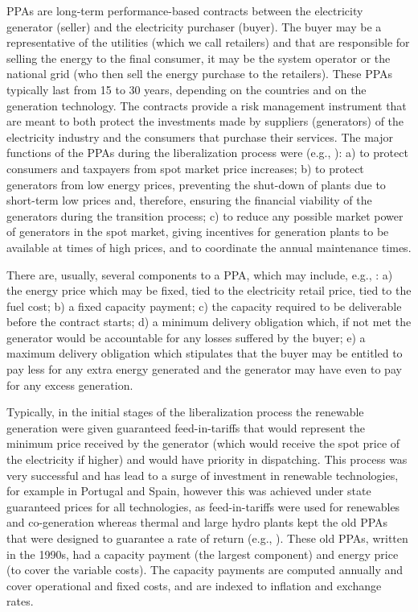 \documentclass[informs]{informs3}
\begin{document}
PPAs are long-term performance-based contracts between the electricity generator (seller) and the electricity purchaser (buyer). The buyer may be a representative of the utilities (which we call retailers) and that are responsible for selling the energy to the final consumer, it may be the system operator or the national grid (who then sell the energy purchase to the retailers). These PPAs typically last from 15 to 30 years, depending on the countries and on the generation technology. The contracts provide a risk management instrument that are meant to both protect the investments made by suppliers (generators) of the electricity industry and the consumers that purchase their services. The major functions of the PPAs during the liberalization process were (e.g., \citealp{Kee_2001}): a) to protect consumers and taxpayers from spot market price increases; b) to protect generators from low energy prices, preventing the shut-down of plants due to short-term low prices and, therefore, ensuring the financial viability of the generators during the transition process; c) to reduce any possible market power of generators in the spot market, giving incentives for generation plants to be available at times of high prices, and to coordinate the annual maintenance times. 

There are, usually, several components to a PPA, which may include, e.g., \cite{RCREEE_2012}: a) the energy price which may be fixed, tied to the electricity retail price, tied to the fuel cost; b) a fixed capacity payment; c) the capacity required to be deliverable before the contract starts; d) a minimum delivery obligation which, if not met the generator would be accountable for any losses suffered by the buyer; e) a maximum delivery obligation which stipulates that the buyer may be entitled to pay less for any extra energy generated and the generator may have even to pay for any excess generation. 

Typically, in the initial stages of the liberalization process the renewable generation were given guaranteed feed-in-tariffs that would represent the minimum price received by the generator (which would receive the spot price of the electricity if higher) and would have priority in dispatching. This process was very successful and has lead to a surge of investment in renewable technologies, for example in Portugal and Spain, however this was achieved under state guaranteed prices for all technologies, as feed-in-tariffs were used for renewables and co-generation whereas thermal and large hydro plants kept the old PPAs that were designed to guarantee a rate of return (e.g., \citealp{Amorim_et_al_2013}). These old PPAs, written in the 1990s, had a capacity payment (the largest component) and energy price (to cover the variable costs). The capacity payments are computed annually and cover operational and fixed costs, and are indexed to inflation and exchange rates.
\end{document}
